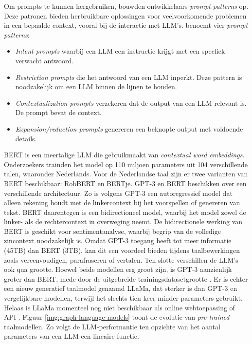 Om prompts te kunnen hergebruiken, bouwden ontwikkelaars \textit{prompt patterns} op. Deze patronen bieden herbruikbare oplossingen voor veelvoorkomende problemen in een bepaalde context, vooral bij de interactie met LLM's. \textcite{White2023} benoemt vier \textit{prompt patterns}:

\begin{itemize}
	\item	\textit{Intent prompts} waarbij een LLM een instructie krijgt met een specfiek verwacht antwoord.
	\item	\textit{Restriction prompts} die het antwoord van een LLM inperkt. Deze pattern is noodzakelijk om een LLM binnen de lijnen te houden.
	\item 	\textit{Contextualization prompts} verzekeren dat de output van een LLM relevant is. De prompt bevat de context.
	\item	\textit{Expansion/reduction prompts} genereren een beknopte output met voldoende details. 
\end{itemize}

\medspace

BERT is een meertalige LLM die gebruikmaakt van \textit{contextual word embeddings}. Onderzoekers trainden het model op 110 miljoen parameters uit 104 verschillende talen, waaronder Nederlands. Voor de Nederlandse taal zijn er twee varianten van BERT beschikbaar: RobBERT en BERTje. GPT-3 en BERT beschikken over een verschillende architectuur. Zo is volgens \textcite{Mottesi2023} GPT-3 een autoregressief model dat alleen rekening houdt met de linkercontext bij het voorspellen of genereren van tekst. BERT daarentegen is een bidirectioneel model, waarbij het model zowel de linker- als de rechtercontext in overweging neemt. De bidirectionele werking van BERT is geschikt voor sentimentanalyse, waarbij begrip van de volledige zincontext noodzakelijk is. Omdat GPT-3 toegang heeft tot meer informatie (45TB) dan BERT (3TB), kan dit een voordeel bieden tijdens taalbewerkingen zoals vereenvoudigen, parafraseren of vertalen. Ten slotte verschillen de LLM's ook qua grootte. Hoewel beide modellen erg groot zijn, is GPT-3 aanzienlijk groter dan BERT, mede door de uitgebreide trainingsdatasetgrootte \autocite{Brown2020}. Er is echter een nieuw generatief taalmodel genaamd LLaMa, dat sterker is dan GPT-3 en vergelijkbare modellen, terwijl het slechts tien keer minder parameters gebruikt. Helaas is LLaMa momenteel nog niet beschikbaar als online webtoepassing of API \autocite{Hern2023, Touvron2023}. Figuur \ref{img:graph-language-models} toont de evolutie van \textit{pre-trained} taalmodellen. Zo volgt de LLM-performantie ten opzichte van het aantal parameters van een LLM een lineaire functie.

